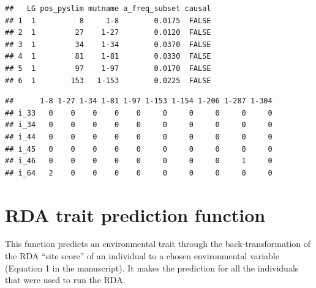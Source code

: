 \documentclass[
]{article}
\newenvironment{Shaded}{\begin{snugshade}}{\end{snugshade}}
\newcommand{\CommentTok}[1]{\textcolor[rgb]{0.56,0.35,0.01}{\textit{#1}}}
\newcommand{\DecValTok}[1]{\textcolor[rgb]{0.00,0.00,0.81}{#1}}
\newcommand{\FunctionTok}[1]{\textcolor[rgb]{0.00,0.00,0.00}{#1}}
\newcommand{\NormalTok}[1]{#1}
\newcommand{\OtherTok}[1]{\textcolor[rgb]{0.56,0.35,0.01}{#1}}
\newcommand{\SpecialCharTok}[1]{\textcolor[rgb]{0.00,0.00,0.00}{#1}}
\newcommand{\StringTok}[1]{\textcolor[rgb]{0.31,0.60,0.02}{#1}}
\begin{document}
\begin{verbatim}
##   LG pos_pyslim mutname a_freq_subset causal
## 1  1          8     1-8        0.0175  FALSE
## 2  1         27    1-27        0.0120  FALSE
## 3  1         34    1-34        0.0370  FALSE
## 4  1         81    1-81        0.0330  FALSE
## 5  1         97    1-97        0.0170  FALSE
## 6  1        153   1-153        0.0225  FALSE
\end{verbatim}

\begin{Shaded}
\end{Shaded}

\begin{verbatim}
##      1-8 1-27 1-34 1-81 1-97 1-153 1-154 1-206 1-287 1-304
## i_33   0    0    0    0    0     0     0     0     0     0
## i_34   0    0    0    0    0     0     0     0     0     0
## i_44   0    0    0    0    0     0     0     0     0     0
## i_45   0    0    0    0    0     0     0     0     0     0
## i_46   0    0    0    0    0     0     0     0     1     0
## i_64   2    0    0    0    0     0     0     0     0     0
\end{verbatim}

\hypertarget{rda-trait-prediction-function}{%
\section{RDA trait prediction
function}\label{rda-trait-prediction-function}}

This function predicts an environmental trait through the
back-transformation of the RDA ``site score'' of an individual to a
chosen environmental variable (Equation 1 in the manuscript). It makes
the prediction for all the individuals that were used to run the RDA.
\end{document}
